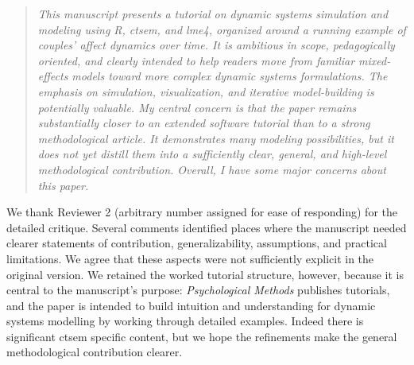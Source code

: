 \documentclass[11pt]{article}
\newenvironment{reviewerpoint}{\begin{quote}\itshape}{\end{quote}}
\begin{document}
\begin{reviewerpoint}
This manuscript presents a tutorial on dynamic systems simulation and modeling using R, ctsem, and lme4, organized around a running example of couples' affect dynamics over time.
It is ambitious in scope, pedagogically oriented, and clearly intended to help readers move from familiar mixed-effects models toward more complex dynamic systems formulations.
The emphasis on simulation, visualization, and iterative model-building is potentially valuable.
My central concern is that the paper remains substantially closer to an extended software tutorial than to a strong methodological article.
It demonstrates many modeling possibilities, but it does not yet distill them into a sufficiently clear, general, and high-level methodological contribution.
Overall, I have some major concerns about this paper.
\end{reviewerpoint}
We thank Reviewer 2 (arbitrary number assigned for ease of responding) for the detailed critique.
Several comments identified places where the manuscript needed clearer statements of contribution, generalizability, assumptions, and practical limitations.
We agree that these aspects were not sufficiently explicit in the original version.
We retained the worked tutorial structure, however, because it is central to the manuscript's purpose: \textit{Psychological Methods} publishes tutorials, and the paper is intended to build intuition and understanding for dynamic systems modelling by working through detailed examples.
Indeed there is significant ctsem specific content, but we hope the refinements make the general methodological contribution clearer.
\end{document}
